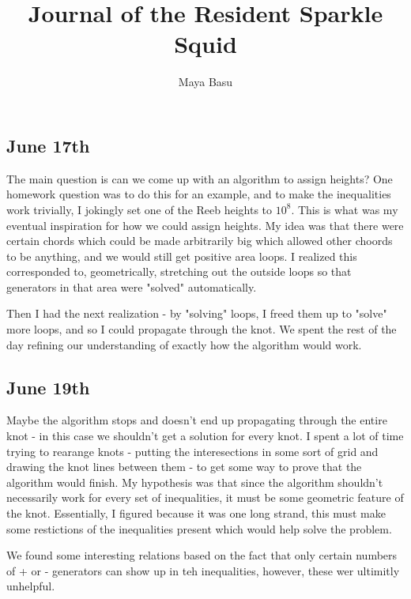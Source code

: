 \documentclass[11pt,oneside]{amsart}
\begin{document}
\author{Maya Basu}


\address{University of California, Berkeley}



\title{Journal of the Resident Sparkle Squid}
\maketitle





\subsection{June 17th} The main question is can we come up with an algorithm to assign heights? One homework question was to do this for an example, and to make the inequalities work trivially, I jokingly set one of the Reeb heights to $10^8$. This is what was my eventual inspiration for how we could assign heights. My idea was that there were certain chords which could be made arbitrarily big which allowed other choords to be anything, and we would still get positive area loops. I realized this corresponded to, geometrically, stretching out the outside loops so that generators in that area were "solved" automatically. 

Then I had the next realization - by "solving" loops, I freed them up to "solve" more loops, and so I could propagate through the knot. 
We spent the rest of the day refining our understanding of exactly how the algorithm would work. 



\subsection{June 19th} Maybe the algorithm stops and doesn't end up propagating through the entire knot - in this case we shouldn't get a solution for every knot. I spent a lot of time trying to rearange knots - putting the interesections in some sort of grid and drawing the knot lines between them - to get some way to prove that the algorithm would finish. My hypothesis was that since the algorithm shouldn't necessarily work for every set of inequalities, it must be some geometric feature of the knot. Essentially, I figured because it was one long strand, this must make some restictions of the inequalities present which would help solve the problem.

We found some interesting relations based on the fact that only certain numbers of + or - generators can show up in teh inequalities, however, these wer ultimitly unhelpful.
\end{document}
